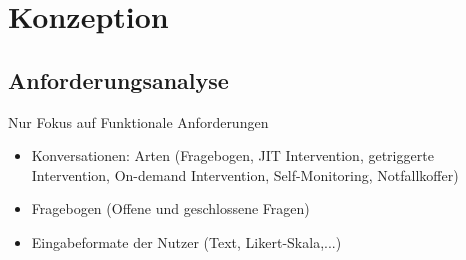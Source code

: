 \chapter{Konzeption}
\label{ch:Design}

\section{Anforderungsanalyse}

Nur Fokus auf Funktionale Anforderungen
\begin{itemize}
\item Konversationen: Arten (Fragebogen, JIT Intervention, getriggerte Intervention, On-demand Intervention, Self-Monitoring, Notfallkoffer)
\item Fragebogen (Offene und geschlossene Fragen)
\item Eingabeformate der Nutzer (Text, Likert-Skala,...)
\end{itemize}


